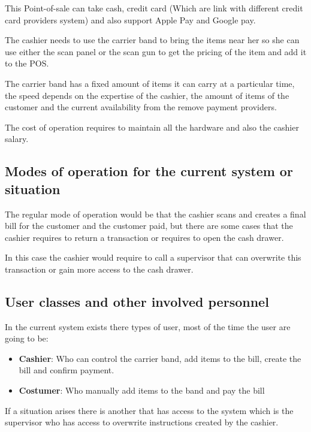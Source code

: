 \documentclass[12pt]{article}
\begin{document}
This Point-of-sale can take cash, credit card (Which are link with different 
credit card providers system) and also support 
Apple Pay and Google pay.\newline

The cashier needs to use the carrier band to bring the items near her so she 
can use either the scan panel or the scan gun to get the pricing of the item 
and add it to the POS.\newline

The carrier band has a fixed amount of items it can carry at a particular time, 
the speed depends on the expertise of the cashier, the amount of items of the 
customer and the current availability from the 
remove payment providers.\newline

The cost of operation requires to maintain all the hardware and also the 
cashier salary.

\subsection{Modes of operation for the current system or situation}
The regular mode of operation would be that the cashier scans and creates a 
final bill for the customer and the customer paid, but there are some 
cases that the cashier requires to return a transaction or requires to open 
the cash drawer. \newline

In this case the cashier would require to call a supervisor that can overwrite 
this transaction or gain more access to the cash drawer. \newline

\pagebreak

\subsection{User classes and other involved personnel}
In the current system exists there types of user, most of the time the user 
are going to be:

\begin{itemize}
	\item \textbf{Cashier}: Who can control the carrier band, add items to the 
    bill, create the bill and confirm payment.
	\item \textbf{Costumer}: Who manually add items to the band and pay the bill
\end{itemize}

If a situation arises there is another that has access to the system which is 
the supervisor who has access to overwrite instructions created by the cashier.
\end{document}
